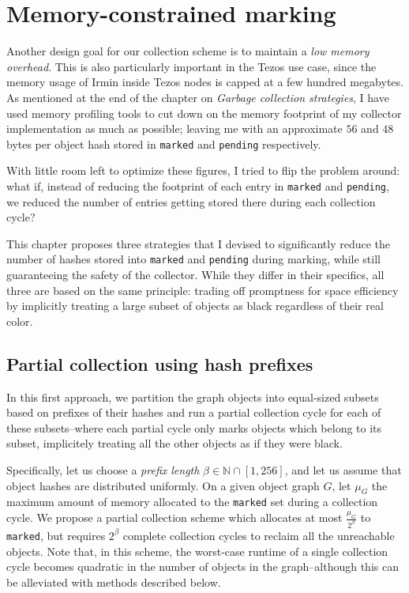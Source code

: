 \section{Memory-constrained marking}

Another design goal for our collection scheme is to maintain a \emph{low memory overhead}. This is also particularly important in the Tezos use case, since the memory usage of Irmin inside Tezos nodes is capped at a few hundred megabytes. As mentioned at the end of the chapter on \emph{Garbage collection strategies}, I have used memory profiling tools to cut down on the memory footprint of my collector implementation as much as possible; leaving me with an approximate \(56\) and \(48\) bytes per object hash stored in \texttt{marked} and \texttt{pending} respectively.

With little room left to optimize these figures, I tried to flip the problem around: what if, instead of reducing the footprint of each entry in \texttt{marked} and \texttt{pending}, we reduced the number of entries getting stored there during each collection cycle?

This chapter proposes three strategies that I devised to significantly reduce the number of hashes stored into \texttt{marked} and \texttt{pending} during marking, while still guaranteeing the safety of the collector. While they differ in their specifics, all three are based on the same principle: trading off promptness for space efficiency by implicitly treating a large subset of objects as black regardless of their real color.

\subsection{Partial collection using hash prefixes}

In this first approach, we partition the graph objects into equal-sized subsets based on prefixes of their hashes and run a partial collection cycle for each of these subsets--where each partial cycle only marks objects which belong to its subset, implicitely treating all the other objects as if they were black.

Specifically, let us choose a \emph{prefix length} \(\beta \in \mathbb{N} \cap [1, 256]\), and let us assume that object hashes are distributed uniformly. On a given object graph \(G\), let \(\mu_G\) the maximum amount of memory allocated to the \texttt{marked} set during a collection cycle. We propose a partial collection scheme which allocates at most \(\frac{\mu_G}{2^\beta}\) to \texttt{marked}, but requires \(2^\beta\) complete collection cycles to reclaim all the unreachable objects. Note that, in this scheme, the worst-case runtime of a single collection cycle becomes quadratic in the number of objects in the graph--although this can be alleviated with methods described below.

